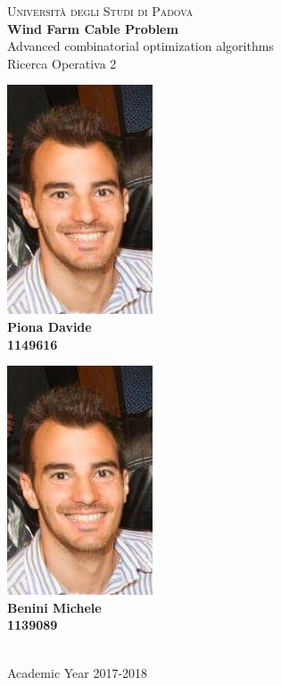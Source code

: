 \begin{titlepage}
\begin{center}
	\vspace{0.2in}	
	\textsc{\LARGE Università degli Studi di Padova}\\[1.5cm]
    \vspace{1.3in}
    \Huge \textmd{\textbf{Wind Farm Cable Problem}}\\
	\vspace{0.1in}   
    \Large Advanced combinatorial optimization algorithms \\
    \Large Ricerca Operativa 2\\
    \vspace{1in}
	\begin{minipage}{5cm} 
	\centering
	\includegraphics[scale=0.5]{Graphics/Foto.jpg} \\
	\textbf{Piona Davide} \\	
	\textbf{1149616}
	\end{minipage}
	\begin{minipage}{5cm} 
	\centering
	\includegraphics[scale=0.5]{Graphics/Foto.jpg} \\
	\textbf{Benini Michele} \\	
	\textbf{1139089}
	\end{minipage}
 	\vspace{1in}
 	\\	
	\Large Academic Year 2017-2018\\
	
  	                    

    \end{center}        
\end{titlepage} 